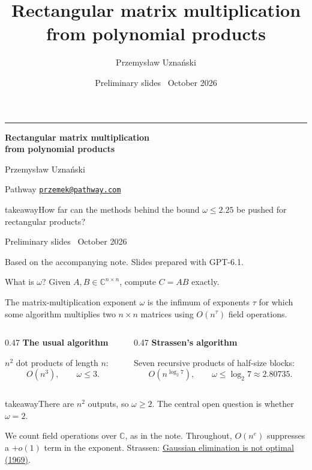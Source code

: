 \documentclass[aspectratio=169,11pt]{beamer}
\title{Rectangular matrix multiplication\\from polynomial products}
\author{Przemysław Uznański}
\institute{Pathway}
\date{Preliminary slides \textbullet\ October 2026}
\newcommand{\CC}{\mathbb C}
\newcommand{\source}[1]{\vfill\par{\fontsize{7.5}{9}\selectfont\color{muted}#1\par}}
\newcommand{\takeaway}[1]{\begin{beamercolorbox}[sep=0.65em,wd=\linewidth]{takeaway}#1\end{beamercolorbox}}
\begin{document}
\begin{frame}[plain]
  \vspace{5mm}
  {\color{teal}\rule{20mm}{1.4mm}}\par\vspace{4mm}
  {\fontsize{26}{31}\selectfont\bfseries Rectangular matrix multiplication\\
  from polynomial products\par}
  \vspace{8mm}
  {\large Przemysław Uznański}\par\vspace{1mm}
  Pathway \quad\href{mailto:przemek@pathway.com}{\texttt{przemek@pathway.com}}
  \vspace{6mm}
  \takeaway{How far can the methods behind the bound $\omega\le2.25$\newline
  be pushed for rectangular products?}
  \vfill
  {\small Preliminary slides \textbullet\ October 2026}\par\vspace{2mm}
  {\fontsize{8}{10}\selectfont\color{muted}
  Based on the accompanying note. Slides prepared with GPT-6.1.\par}
\end{frame}

\begin{frame}{What is $\omega$?}
  Given $A,B\in\CC^{n\times n}$, compute $C=AB$ exactly.
  \begin{block}{The matrix-multiplication exponent}
    $\omega$ is the infimum of exponents $\tau$ for which some algorithm
    multiplies two $n\times n$ matrices using $O(n^\tau)$ field operations.
  \end{block}
  \medskip
  \begin{columns}[T,onlytextwidth]
    \begin{column}{0.47\textwidth}
      \textbf{The usual algorithm}\par\medskip
      $n^2$ dot products of length $n$:
      \[
        O(n^3),\qquad\omega\le3.
      \]
    \end{column}
    \begin{column}{0.47\textwidth}
      \textbf{Strassen's algorithm}\par\medskip
      Seven recursive products of half-size blocks:
      \[
        O(n^{\log_2 7}),\qquad\omega\le\log_2 7\approx2.80735.
      \]
    \end{column}
  \end{columns}
  \takeaway{There are $n^2$ outputs, so $\omega\ge2$.
    The central open question is whether $\omega=2$.}
  \source{We count field operations over $\CC$, as in the note.
  Throughout, $O(n^e)$ suppresses a $+o(1)$ term in the exponent.
  Strassen: \href{https://doi.org/10.1007/BF02165411}{Gaussian elimination is not optimal (1969)}.}
\end{frame}
\end{document}
